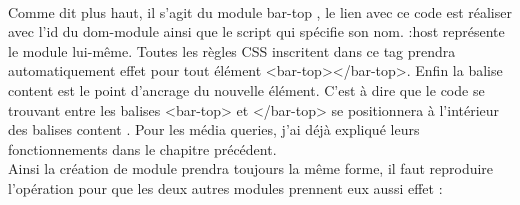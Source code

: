 \documentclass{article}
\begin{document}
\vspace{0.5cm}\\
Comme dit plus haut, il s'agit du module \og bar-top \fg{}, le lien avec ce code est r\'ealiser avec l'id du dom-module ainsi que le script qui sp\'ecifie son nom. \og :host \fg{} repr\'esente le module lui-m\^eme. Toutes les r\`egles CSS inscritent dans ce tag prendra automatiquement effet pour tout \'el\'ement <bar-top></bar-top>. Enfin la balise \og content \fg{} est le point d'ancrage du nouvelle \'el\'ement. C'est \`a dire que le code se trouvant entre les balises <bar-top> et </bar-top> se positionnera \`a l'int\'erieur des balises \og content \fg{}. Pour les m\'edia queries, j'ai d\'ej\`a expliqu\'e leurs fonctionnements dans le chapitre pr\'ec\'edent.\\
Ainsi la cr\'eation de module prendra toujours la m\^eme forme, il faut reproduire l'op\'eration pour que les deux autres modules prennent eux aussi effet :   
\vspace{0.5cm}\\
\end{document}

